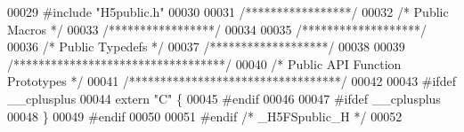 \begin{DoxyCode}
00029 \textcolor{preprocessor}{#include "H5public.h"}
00030 
00031 \textcolor{comment}{/*****************/}
00032 \textcolor{comment}{/* Public Macros */}
00033 \textcolor{comment}{/*****************/}
00034 
00035 \textcolor{comment}{/*******************/}
00036 \textcolor{comment}{/* Public Typedefs */}
00037 \textcolor{comment}{/*******************/}
00038 
00039 \textcolor{comment}{/**********************************/}
00040 \textcolor{comment}{/* Public API Function Prototypes */}
00041 \textcolor{comment}{/**********************************/}
00042 
00043 \textcolor{preprocessor}{#ifdef \_\_cplusplus}
00044 \textcolor{keyword}{extern} \textcolor{stringliteral}{"C"} \{
00045 \textcolor{preprocessor}{#endif}
00046 
00047 \textcolor{preprocessor}{#ifdef \_\_cplusplus}
00048 \}
00049 \textcolor{preprocessor}{#endif}
00050 
00051 \textcolor{preprocessor}{#endif }\textcolor{comment}{/* \_H5FSpublic\_H */}\textcolor{preprocessor}{}
00052 
\end{DoxyCode}
